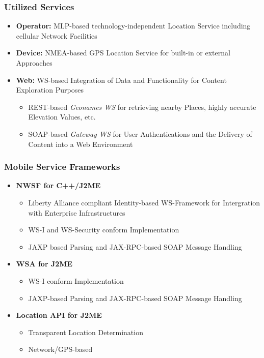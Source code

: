 \documentclass[blue]{beamer}
\begin{document}
\frame
{
\frametitle{\textbf{Utilized Services}}
\begin{itemize}[<+-|alert@+>]
  \item \textbf{Operator:} MLP-based technology-independent Location Service including cellular Network Facilities
  \item \textbf{Device:} NMEA-based GPS Location Service for built-in or external Approaches
  \item \textbf{Web:} WS-based Integration of Data and Functionality for Content Exploration Purposes
  \begin{itemize}
    \item REST-based \textit{Geonames WS} for retrieving nearby Places, highly accurate Elevation Values, etc.
    \item SOAP-based \textit{Gateway WS} for User Authentications and the Delivery of Content into a Web Environment
  \end{itemize}
\end{itemize}
}

\frame
{
\frametitle{\textbf{Mobile Service Frameworks}}
\begin{itemize}
\item \textbf{NWSF for C++/J2ME}
  \begin{itemize}
    \item Liberty Alliance compliant Identity-based WS-Framework for Intergration with Enterprise Infrastructures
    \item WS-I and WS-Security conform Implementation
    \item JAXP based Parsing and JAX-RPC-based SOAP Message Handling
  \end{itemize}
\item \textbf{WSA for J2ME}
  \begin{itemize}
    \item WS-I conform Implementation
    \item JAXP-based Parsing and JAX-RPC-based SOAP Message Handling
  \end{itemize}
\item \textbf{Location API for J2ME}
  \begin{itemize}
    \item Transparent Location Determination
    \item Network/GPS-based
  \end{itemize}
\end{itemize}
}

\end{document}
